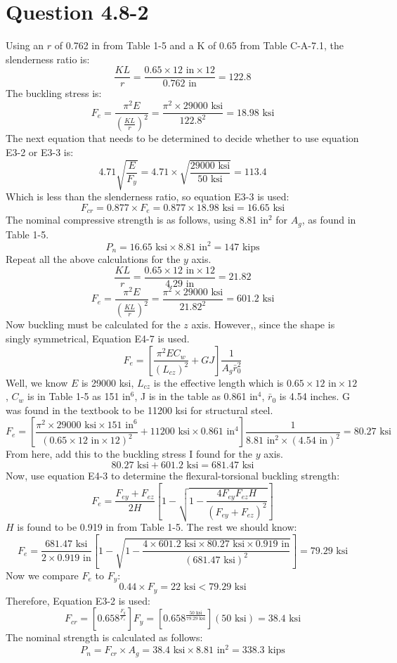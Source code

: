 \documentclass{article}
\begin{document}
\section*{Question 4.8-2}
Using an $r$ of 0.762 in from Table 1-5 and a K of 0.65 from Table C-A-7.1, the slenderness ratio is: 
\[\frac{KL}{r}=\frac{0.65\times12\text{ in}\times12}{0.762\text{ in}}=122.8\] 
The buckling stress is: 
\[F_e=\frac{\pi^2E}{\left(\frac{KL}{r}\right)^2}=\frac{\pi^2\times29000\text{ ksi}}{122.8^2}=18.98\text{ ksi}\]
The next equation that needs to be determined to decide whether to use equation E3-2 or E3-3 is: 
\[4.71\sqrt{\frac{E}{F_y}}=4.71\times\sqrt{\frac{29000\text{ ksi}}{50\text{ ksi}}}=113.4\]
Which is less than the slenderness ratio, so equation E3-3 is used: 
\[F_{cr}=0.877\times F_e=0.877\times18.98\text{ ksi}=16.65\text{ ksi}\]
The nominal compressive strength is as follows, using 8.81 $\text{in}^2$ for $A_g$, as found in Table 1-5. 
\[P_n=16.65\text{ ksi}\times 8.81\text{ in}^2=147\text{ kips}\] 
Repeat all the above calculations for the $y$ axis. 
\[\frac{KL}{r}=\frac{0.65\times12\text{ in}\times12}{4.29\text{ in}}=21.82\] 
\[F_e=\frac{\pi^2E}{\left(\frac{KL}{r}\right)^2}=\frac{\pi^2\times29000\text{ ksi}}{21.82^2}=601.2\text{ ksi}\] 
Now buckling must be calculated for the $z$ axis. However,, since the shape is singly symmetrical, Equation E4-7 is used. 
\[F_{e}=\left[\frac{\pi^2EC_w}{\left(L_{cz}\right)^2}+GJ\right]\frac{1}{A_g \bar{r}_0^2}\]
Well, we know $E$ is 29000 ksi, $L_{cz}$ is the effective length which is $0.65\times 12\text{ in}\times 12$, $C_w$ is in Table 1-5 as 151 $\text{in}^6$, J is in the table as 0.861 $\text{in}^4$, $\bar{r}_0$ is 4.54 inches. G was found in the textbook to be 11200 ksi for structural steel. 
\[F_{e}=\left[\frac{\pi^2\times29000\text{ ksi}\times151\text{ in}^6}{\left(0.65\times 12\text{ in}\times 12\right)^2}+11200\text{ ksi} \times 0.861\text{ in}^4\right]\frac{1}{8.81\text{ in}^2\times(4.54\text{ in})^2}=80.27\text{ ksi}\] 
From here, add this to the buckling stress I found for the $y$ axis. 
\[80.27\text{ ksi}+601.2\text{ ksi}=681.47\text{ ksi}\]
Now, use equation E4-3 to determine the flexural-torsional buckling strength: 
\[F_e=\frac{F_{ey}+F_{ez}}{2H}\left[1-\sqrt{1-\frac{4F_{ey}F_{ez}H}{\left(F_{ey}+F_{ez}\right)^2}}\right]\]
$H$ is found to be 0.919 in from Table 1-5. The rest we should know: 
\[F_e=\frac{681.47\text{ ksi}}{2\times 0.919\text{ in}}\left[1-\sqrt{1-\frac{4\times601.2\text{ ksi}\times 80.27\text{ ksi}\times0.919\text{ in}}{\left(681.47\text{ ksi}\right)^2}}\right]=79.29\text{ ksi}\]
Now we compare $F_e$ to $F_y$: 
\[0.44\times F_y=22\text{ ksi}<79.29\text{ ksi}\] 
Therefore, Equation E3-2 is used: 
\[F_{cr}=\left[0.658^{\frac{F_y}{F_e}}\right]F_y=\left[0.658^{\frac{50\text{ ksi}}{79.29\text{ ksi}}}\right](50\text{ ksi})=38.4\text{ ksi}\]
The nominal strength is calculated as follows: 
\[P_n=F_{cr}\times A_g=38.4\text{ ksi}\times 8.81\text{ in}^2=\boxed{338.3\text{ kips}}\]
\end{document}

